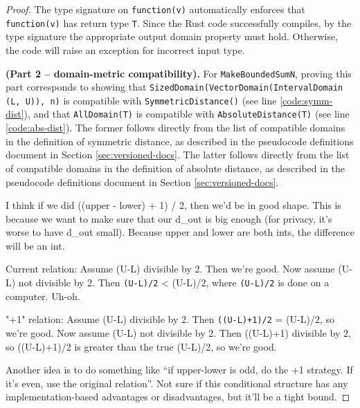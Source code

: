\documentclass[11pt,a4paper]{article}
\theoremstyle{definition}
\newcommand{\connor}[1]{{ {\color{teal}{(connor)~#1}}}}
\begin{document}
\begin{proof}
    The type signature on \texttt{function(v)} automatically enforces that \texttt{function(v)} has return type \texttt{T}. Since the Rust code successfully compiles, by the type signature the appropriate output domain property must hold. Otherwise, the code will raise an exception for incorrect input type.
    
    \smallskip
    
    \textbf{(Part 2 -- domain-metric compatibility).} For \texttt{MakeBoundedSumN}, proving this part corresponds to showing that \texttt{SizedDomain(VectorDomain(IntervalDomain (L, U)), n)} is compatible with \texttt{SymmetricDistance()} (see line \ref{code:symm-dist}), and that \texttt{AllDomain(T)} is compatible with \texttt{AbsoluteDistance(T)} (see line \ref{code:abs-dist}).
    The former follows directly from the list of compatible domains in the definition of symmetric distance, as described in the pseudocode definitions document in Section \ref{sec:versioned-docs}. The latter follows directly from the list of compatible domains in the definition of absolute distance, as described in the pseudocode definitions document in Section \ref{sec:versioned-docs}. 
    
    
    \iffalse
    \smallskip
    
    \connor{Problem with current stability guarantee. Ideas copied from Slack, so sorry about the formatting.}
    
    \color{teal}
    
    I think if we did ((upper - lower) + 1) / 2, then we'd be in good shape. This is because we want to make sure that our d\_out is big enough (for privacy, it's worse to have d\_out small). Because upper and lower are both ints, the difference will be an int.

    Current relation: Assume (U-L) divisible by 2. Then we're good. Now assume (U-L) not divisible by 2. Then \texttt{(U-L)/2} < (U-L)/2, where \texttt{(U-L)/2} is done on a computer. Uh-oh.

    "+1" relation: Assume (U-L) divisible by 2. Then \texttt{((U-L)+1)/2} = (U-L)/2, so we're good. Now assume (U-L) not divisible by 2. Then ((U-L)+1) divisible by 2, so ((U-L)+1)/2 is greater than the true (U-L)/2, so we're good.
    
    
    Another idea is to do something like ``if upper-lower is odd, do the +1 strategy. If it's even, use the original relation''. Not sure if this conditional structure has any implementation-based advantages or disadvantages, but it'll be a tight bound.
    

\end{proof}
\end{document}
